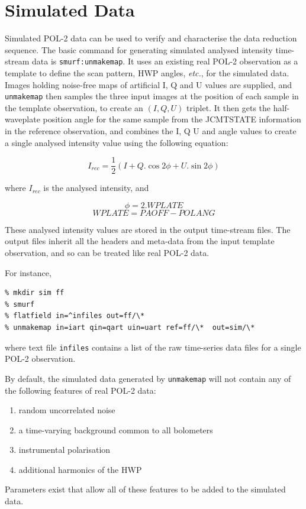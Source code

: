 \documentclass[twoside,11pt]{starlink}
\begin{document}
\section{Simulated Data}
\label{sec:sim}
Simulated POL-2 data can be used to verify and characterise the data
reduction sequence. The basic command for generating simulated analysed
intensity time-stream data is \texttt{smurf:unmakemap}. It uses an
existing real POL-2 observation as a template to define the scan pattern,
HWP angles, \emph{etc.}, for the simulated data. Images holding noise-free
maps of artificial I, Q and
U values are supplied, and \texttt{unmakemap} then samples the three
input images at the position of each sample in the template observation,
to create an $(I,Q,U)$ triplet. It then gets the half-waveplate position
angle for the same sample from the JCMTSTATE information in the reference
observation, and combines the I, Q U and angle values to create a single
analysed intensity value using the following equation:

\[ I_{rec} = \frac{1}{2}( I + Q.\cos 2\phi + U.\sin 2\phi ) \]

where $I_{rec}$ is the analysed intensity, and

\[ \phi = 2.WPLATE \]
\[ WPLATE = PAOFF - POLANG \]

These analysed intensity values are stored in the output time-stream files. The
output files inherit all the headers and meta-data from the input
template observation, and so can be treated like real POL-2 data.

For instance,
\begin{verbatim}
% mkdir sim ff
% smurf
% flatfield in=^infiles out=ff/\*
% unmakemap in=iart qin=qart uin=uart ref=ff/\*  out=sim/\*
\end{verbatim}

where text file \texttt{infiles} contains a list of the raw time-series
data files for a single POL-2 observation.

By default, the simulated data generated by \texttt{unmakemap} will not
contain any of the following features of real POL-2 data:
\begin{enumerate}
\item random uncorrelated noise
\item a time-varying background common to all bolometers
\item instrumental polarisation
\item additional harmonics of the HWP
\end{enumerate}
Parameters exist that allow all of these features to be added to the
simulated data.
\end{document}
